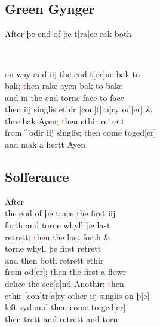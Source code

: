 \documentclass[12pt,letter]{article} %
\newcommand{\red}[1]{\textcolor{red}{#1}}
\newcommand{\srcpg}[1]{
    \noindent{
        \color{Gray}{\rule[0.5ex]{\linewidth}{1pt}~#1} 
    
    }
}
\begin{document}
\subsection{Green Gynger}
After þe end of þe t{[}ra{]}ce rak both
\srcpg{63}
\ 

on way and iij the end t{[}or{]}ne bak to\\
bak; \red{t}hen rake ayen bak to bake\\
and in the end torne face to face\\
then iij singlis ethir {[}con{]}t{[}ra{]}ry od{[}er{]} \&\\
thre bak Ayen; \red{t}hen ethir retrett\\
from \^{}odir iij singlis; \red{t}hen come toged{[}er{]}\\
and mak a hertt Ayen

\subsection{Sofferance}
After\\
the end of þe trace the first iij\\
forth and torne whyll þe last \\
retrett; \red{t}hen the last forth \&\\ 
torne whyll þe first retrett\\
and then both retrett ethir\\
from od{[}er{]}; \red{t}hen the first a flowr\\
delice the sec{[}o{]}nd Anothir; \red{t}hen\\
ethir {[}con{]}tr{[}a{]}ry other iij singlis on þ{[}e{]}\\
left syd \red{a}nd then come to ged{[}er{]}\\
then trett and retrett and torn
\end{document}
